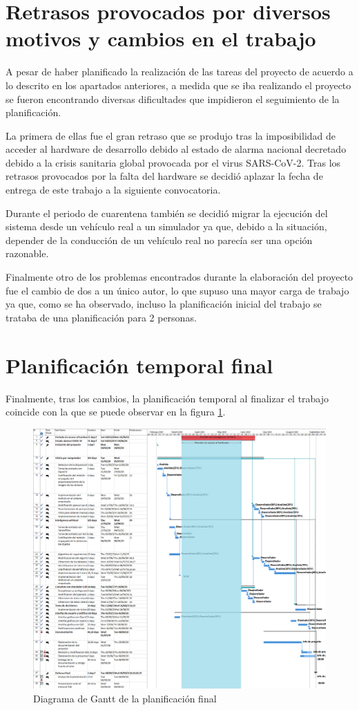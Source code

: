 \section{Retrasos provocados por diversos motivos y cambios en el trabajo}

A pesar de haber planificado la realización de las tareas del proyecto de acuerdo a lo descrito en los apartados anteriores, a medida que se iba realizando el proyecto se fueron encontrando diversas dificultades que impidieron el seguimiento de la planificación.

La primera de ellas fue el gran retraso que se produjo tras la imposibilidad de acceder al hardware de desarrollo debido al estado de alarma nacional decretado debido a la crisis sanitaria global provocada por el virus SARS-CoV-2.
Tras los retrasos provocados por la falta del hardware se decidió aplazar la fecha de entrega de este trabajo a la siguiente convocatoria. 

Durante el periodo de cuarentena también se decidió migrar la ejecución del sistema desde un vehículo real a un simulador ya que, debido a la situación, depender de la conducción de un vehículo real no parecía ser una opción razonable.

Finalmente otro de los problemas encontrados durante la elaboración del proyecto fue el cambio de dos a un único autor, lo que supuso una mayor carga de trabajo ya que, como se ha observado, incluso la planificación inicial del trabajo se trataba de una planificación para 2 personas.


\section{Planificación temporal final} \label{sec:planTemporalFinal}
Finalmente, tras los cambios, la planificación temporal al finalizar el trabajo coincide con la que se puede observar en la figura \ref{fig:ganttfinal}.
\begin{figure}[t]
    \centering
    \includegraphics[width=\linewidth]{img/Final/gantt.png}
    \caption{Diagrama de Gantt de la planificación final}
    \label{fig:ganttfinal}    
\end{figure}


